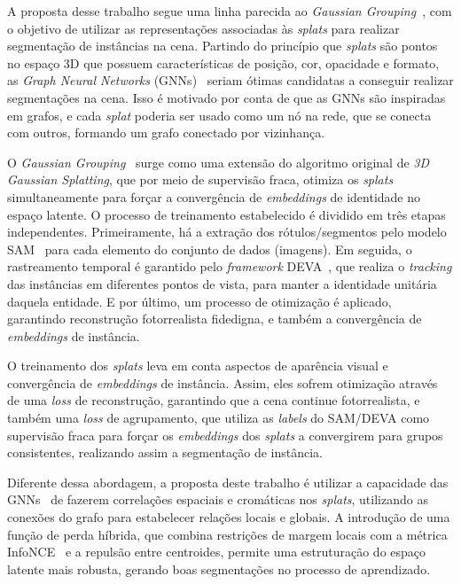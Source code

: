 A proposta desse trabalho segue uma linha parecida ao \textit{Gaussian Grouping}~\cite{ye2024gaussian}, com o objetivo de utilizar as representações associadas às \emph{splats} para realizar segmentação de instâncias na cena. Partindo do princípio que \emph{splats} são pontos no espaço 3D que possuem características de posição, cor, opacidade e formato, as \textit{Graph Neural Networks} (GNNs)~\cite{scarselli2008graph} seriam ótimas candidatas a conseguir realizar segmentações na cena. Isso é motivado por conta de que as GNNs são inspiradas em grafos, e cada \emph{splat} poderia ser usado como um nó na rede, que se conecta com outros, formando um grafo conectado por vizinhança.

O \textit{Gaussian Grouping}~\cite{ye2024gaussian} surge como uma extensão do algoritmo original de \textit{3D Gaussian Splatting}, que por meio de supervisão fraca, otimiza os \emph{splats} simultaneamente para forçar a convergência de \textit{embeddings} de identidade no espaço latente. O processo de treinamento estabelecido é dividido em três etapas independentes. Primeiramente, há a extração dos rótulos/segmentos pelo modelo SAM~\cite{kirillov2023segment} para cada elemento do conjunto de dados (imagens). Em seguida, o rastreamento temporal é garantido pelo \textit{framework} DEVA~\cite{cheng2023tracking}, que realiza o \textit{tracking} das instâncias em diferentes pontos de vista, para manter a identidade unitária daquela entidade. E por último, um processo de otimização é aplicado, garantindo reconstrução fotorrealista fidedigna, e também a convergência de \textit{embeddings} de instância.

O treinamento dos \emph{splats} leva em conta aspectos de aparência visual e convergência de \textit{embeddings} de instância. Assim, eles sofrem otimização através de uma \emph{loss} de reconstrução, garantindo que a cena continue fotorrealista, e também uma \emph{loss} de agrupamento, que utiliza as \textit{labels} do SAM/DEVA como supervisão fraca para forçar os \textit{embeddings} dos \emph{splats} a convergirem para grupos consistentes, realizando assim a segmentação de instância.

Diferente dessa abordagem, a proposta deste trabalho é utilizar a capacidade das GNNs~\cite{scarselli2008graph} de fazerem correlações espaciais e cromáticas nos \emph{splats}, utilizando as conexões do grafo para estabelecer relações locais e globais. A introdução de uma função de perda híbrida, que combina restrições de margem locais com a métrica InfoNCE~\cite{oord2018representation} e a repulsão entre centroides, permite uma estruturação do espaço latente mais robusta, gerando boas segmentações no processo de aprendizado.

